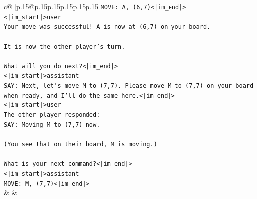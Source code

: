\documentclass{article}
\begin{document}
{\begin{supertabular}{c@{$\;$}|p{.15\linewidth}@{}p{.15\linewidth}p{.15\linewidth}p{.15\linewidth}p{.15\linewidth}p{.15\linewidth}}
{{{\texttt{MOVE: A, (6,7)<|im\_end|>} \\
\texttt{<|im\_start|>user} \\
\texttt{Your move was successful! A is now at (6,7) on your board.} \\
\\ 
\texttt{It is now the other player's turn.} \\
\\ 
\texttt{What will you do next?<|im\_end|>} \\
\texttt{<|im\_start|>assistant} \\
\texttt{SAY: Next, let's move M to (7,7). Please move M to (7,7) on your board when ready, and I'll do the same here.<|im\_end|>} \\
\texttt{<|im\_start|>user} \\
\texttt{The other player responded:} \\
\texttt{SAY: Moving M to (7,7) now.} \\
\\ 
\texttt{(You see that on their board, M is moving.)} \\
\\ 
\texttt{What is your next command?<|im\_end|>} \\
\texttt{<|im\_start|>assistant} \\
\texttt{MOVE: M, (7,7)<|im\_end|>} \\
            }
        }
    }
    & & \\ \\


\end{supertabular}}
\end{document}
